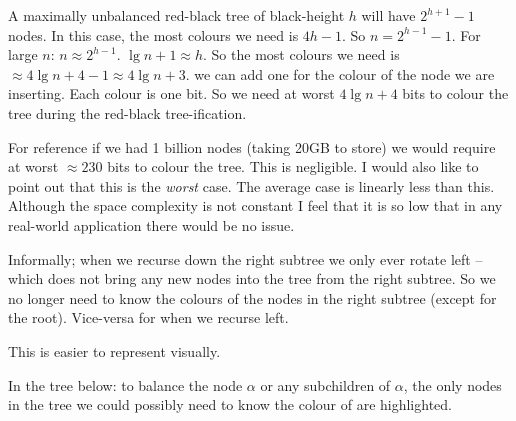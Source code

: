 \documentclass[10pt,\jkfside,a4paper]{article}
\begin{document}
\begin{enumerate}
\begin{enumerate}
A maximally unbalanced red-black tree of black-height $h$ will have $2^{h + 1} - 1$ nodes. In this case, the most 
colours we need is $4h - 1$. So $n = 2^{h - 1} - 1$. For large $n$: $n \approx 2^{h - 1}$. $\lg n + 1 \approx h$. 
So the most colours we need is $\approx 4 \lg n + 4 - 1 \approx 4 \lg n + 3$. we can add one for the colour of the 
node we are inserting. Each colour is one bit. So we need at 
worst $4 \lg n + 4$ bits to colour the tree during the red-black tree-ification. 

For reference if we had 1 billion nodes (taking 20GB to store) we would require at worst $\approx 230$ bits to colour 
the tree. This is negligible. I would also like to point out that this is the \textit{worst} case. The average 
case is linearly less than this. Although the space complexity is not constant I feel that it is so low 
that in any real-world application there would be no issue.

Informally; when we recurse down the right subtree we only ever rotate left -- which does not bring any new nodes into the 
tree from the right subtree. So we no longer need to know the colours of the nodes in the right subtree (except for the root). 
Vice-versa for when we recurse left.

This is easier to represent visually.

In the tree below: to balance the node $\alpha$ or any subchildren of $\alpha$, the only nodes in the tree we could possibly 
need to know the colour of are highlighted.


\end{enumerate}
\end{enumerate}
\end{document}
